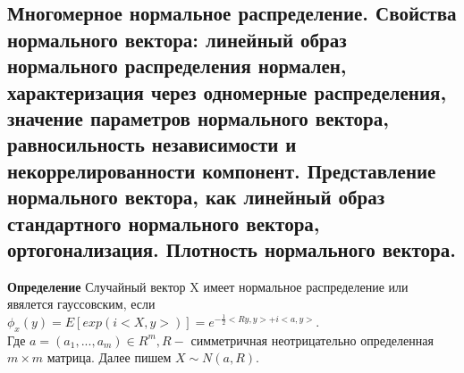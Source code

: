 \subsection{Многомерное нормальное распределение. Свойства нормального вектора: линейный образ нормального распределения нормален, характеризация через одномерные распределения, значение параметров нормального вектора, равносильность независимости и некоррелированности компонент. Представление нормального вектора, как линейный образ стандартного нормального вектора, ортогонализация. Плотность нормального вектора.}
\textbf{Определение} Случайный вектор X имеет нормальное распределение или явялется гауссовским, если $\phi_x(y) = E[exp(i<X, y>)] = e^{-\frac{1}{2}<Ry, y> + i<a, y>}$.\\
Где $a = (a_1, ..., a_m) \in R^m, R -$ симметричная неотрицательно определенная $m\times m$ матрица. Далее пишем $X \sim N(a, R)$.\\
